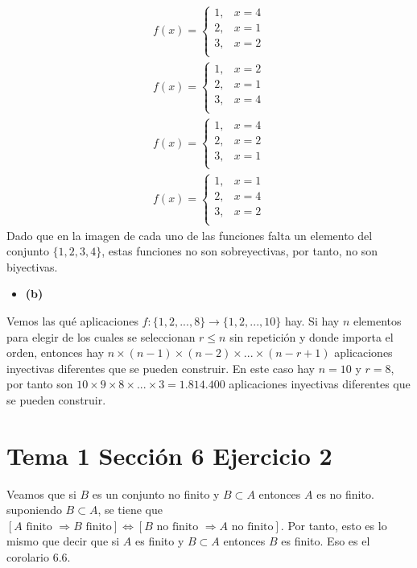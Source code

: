 \documentclass{article}
\begin{document}
\begin{eqnarray}
f(x)=\begin{cases}
1,& x=4\nonumber\\
2,& x=1\nonumber\\
3,& x=2\nonumber\\
\end{cases}
\end{eqnarray}
\begin{eqnarray}
f(x)=\begin{cases}
1,& x=2\nonumber\\
2,& x=1\nonumber\\
3,& x=4\nonumber\\
\end{cases}
\end{eqnarray}
\begin{eqnarray}
f(x)=\begin{cases}
1,& x=4\nonumber\\
2,& x=2\nonumber\\
3,& x=1\nonumber\\
\end{cases}
\end{eqnarray}
\begin{eqnarray}
f(x)=\begin{cases}
1,& x=1\nonumber\\
2,& x=4\nonumber\\
3,& x=2\nonumber\\
\end{cases}
\end{eqnarray}
Dado que en la imagen de cada uno de las funciones falta un elemento del conjunto $\{1,2,3,4\}$, estas funciones no son sobreyectivas, por tanto, no son biyectivas.
\begin{itemize}
\item \bf (b) \rm
\end{itemize}
Vemos las qué aplicaciones $f:\{1,2,...,8\}\rightarrow \{1,2,...,10\}$ hay. Si hay $n$ elementos para elegir de los cuales se seleccionan $r\leq n$ sin repetición y donde importa el orden, entonces hay $n\times (n-1)\times (n-2)\times ... \times (n-r+1)$ aplicaciones  inyectivas diferentes que se pueden construir. En este caso hay $n=10$ y $r=8$, por tanto son $10\times 9\times 8\times ... \times 3=1.814.400$ aplicaciones  inyectivas diferentes que se pueden construir.

\section{Tema 1 Sección 6 Ejercicio 2}
Veamos que si $B$ es un conjunto no finito y $B\subset A$ entonces $A$ es no finito. suponiendo $B\subset A$, se tiene que  $[A\text{ finito  }\Rightarrow B\text{ finito}] \Leftrightarrow [B\text{ no finito }\Rightarrow A\text{ no finito}]$. Por tanto, esto es lo mismo que decir que si $A$ es finito y $B\subset A$ entonces $B$ es finito. Eso es el corolario 6.6.
\end{document}
